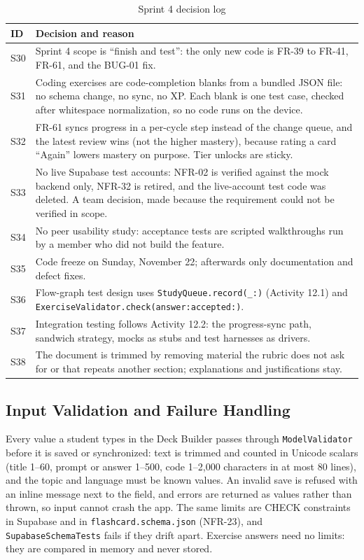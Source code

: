 \documentclass[12pt,letterpaper]{article}
\begin{document}
\begin{table}[H]
\centering
\caption{Sprint 4 decision log}
\label{tab:decisions4}
\begin{tabularx}{\textwidth}{@{}l Y@{}}
\toprule
\textbf{ID} & \textbf{Decision and reason} \\
\midrule
S30 & Sprint 4 scope is ``finish and test'': the only new code is FR-39 to FR-41, FR-61, and the BUG-01 fix. \\
S31 & Coding exercises are code-completion blanks from a bundled JSON file: no schema change, no sync, no XP. Each blank is one test case, checked after whitespace normalization, so no code runs on the device. \\
S32 & FR-61 syncs progress in a per-cycle step instead of the change queue, and the latest review wins (not the higher mastery), because rating a card ``Again'' lowers mastery on purpose. Tier unlocks are sticky. \\
S33 & No live Supabase test accounts: NFR-02 is verified against the mock backend only, NFR-32 is retired, and the live-account test code was deleted. A team decision, made because the requirement could not be verified in scope. \\
S34 & No peer usability study: acceptance tests are scripted walkthroughs run by a member who did not build the feature. \\
S35 & Code freeze on Sunday, November 22; afterwards only documentation and defect fixes. \\
S36 & Flow-graph test design uses \texttt{StudyQueue.record(\_:)} (Activity 12.1) and \texttt{ExerciseValidator.check(answer:accepted:)}. \\
S37 & Integration testing follows Activity 12.2: the progress-sync path, sandwich strategy, mocks as stubs and test harnesses as drivers. \\
S38 & The document is trimmed by removing material the rubric does not ask for or that repeats another section; explanations and justifications stay. \\
\bottomrule
\end{tabularx}
\end{table}

\subsection{Input Validation and Failure Handling}
Every value a student types in the Deck Builder passes through
\texttt{ModelValidator} before it is saved or synchronized: text is trimmed and
counted in Unicode scalars (title 1--60, prompt or answer 1--500, code 1--2,000
characters in at most 80 lines), and the topic and language must be known values.
An invalid save is refused with an inline message next to the field, and errors are
returned as values rather than thrown, so input cannot crash the app. The same limits
are CHECK constraints in Supabase and in \texttt{flashcard.schema.json} (NFR-23), and
\texttt{SupabaseSchemaTests} fails if they drift apart. Exercise answers need no
limits: they are compared in memory and never stored.
\end{document}
